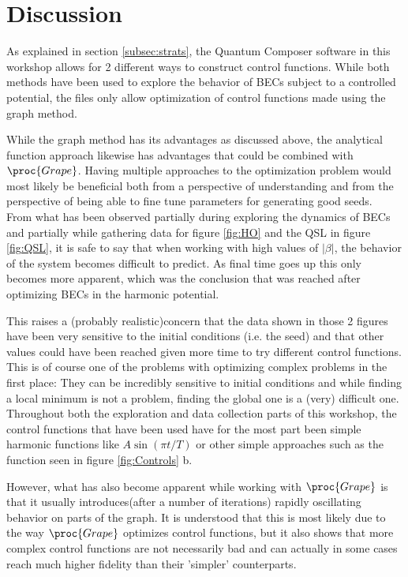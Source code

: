 \documentclass[aps,pra,reprint,superscriptaddress]{revtex4-1}
\begin{document}
\section{\label{sec:disc}Discussion}
As explained in section \ref{subsec:strats}, the Quantum Composer software in this workshop allows for 2 different ways to construct control functions. While both methods have been used to explore the behavior of BECs subject to a controlled potential, the files only allow optimization of control functions made using the graph method. 

While the graph method has its advantages as discussed above, the analytical function approach likewise has advantages that could be combined with $\proc{Grape}$. Having multiple approaches to the optimization problem would most likely be beneficial both from a perspective of understanding and from the perspective of being able to fine tune parameters for generating good seeds.\\

From what has been observed partially during exploring the dynamics of BECs and partially while gathering data for figure \ref{fig:HO} and the QSL in figure \ref{fig:QSL}, it is safe to say that when working with high values of $|\beta|$, the behavior of the system becomes difficult to predict. As final time goes up this only becomes more apparent, which was the conclusion that was reached after optimizing BECs in the harmonic potential. 

This raises a (probably realistic)concern that the data shown in those 2 figures have been very sensitive to the initial conditions (i.e. the seed) and that other values could have been reached given more time to try different control functions. This is of course one of the problems with optimizing complex problems in the first place: They can be incredibly sensitive to initial conditions and while finding a local minimum is not a problem, finding the global one is a (very) difficult one.\\

Throughout both the exploration and data collection parts of this workshop, the control functions that have been used have for the most part been simple harmonic functions like $A\sin(\pi t/T)$ or other simple approaches such as the function seen in figure \ref{fig:Controls} b. 

However, what has also become apparent while working with $\proc{Grape}$ is that it usually introduces(after a number of iterations) rapidly oscillating behavior on parts of the graph. It is understood that this is most likely due to the way $\proc{Grape}$ optimizes control functions, but it also shows that more complex control functions are not necessarily bad and can actually in some cases reach much higher fidelity than their 'simpler' counterparts. 
\end{document}
